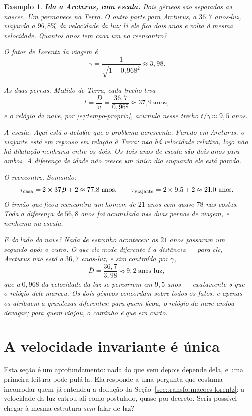\documentclass[12pt,a4paper,oneside]{book}
\theoremstyle{rgplain}
\newtheorem{example}{Exemplo}[chapter]
\theoremstyle{rgremark}
\begin{document}
\begin{example}
\textbf{Ida a Arcturus, com escala.} Dois gêmeos são separados ao nascer. Um
permanece na Terra. O outro parte para Arcturus, a $36{,}7$ anos-luz, viajando a
$96{,}8\%$ da velocidade da luz; lá ele fica \emph{dois anos} e volta à mesma
velocidade. Quantos anos tem cada um no reencontro?

O fator de Lorentz da viagem é
\[
  \gamma=\frac{1}{\sqrt{1-0{,}968^2}}\approx 3{,}98 .
\]

\emph{As duas pernas.} Medido da Terra, cada trecho leva
\[
  t=\frac{D}{v}=\frac{36{,}7}{0{,}968}\approx 37{,}9\ \text{anos},
\]
e o relógio da nave, por \eqref{eq:tempo-proprio}, acumula nesse trecho
$t/\gamma\approx 9{,}5$ anos.

\emph{A escala.} Aqui está o detalhe que o problema acrescenta. Parado em
Arcturus, o viajante está em repouso em relação à Terra: não há velocidade
relativa, logo não há dilatação nenhuma entre os dois. Os dois anos de escala
são dois anos \emph{para ambos}. A diferença de idade não cresce um único dia
enquanto ele está parado.

\emph{O reencontro.} Somando:
\[
  \tau_{\rm casa}=2\times 37{,}9+2\approx 77{,}8\ \text{anos},
  \qquad
  \tau_{\rm viajante}=2\times 9{,}5+2\approx 21{,}0\ \text{anos}.
\]
O irmão que ficou reencontra um homem de $21$ anos com quase $78$ nas costas.
Toda a diferença de $56{,}8$ anos foi acumulada nas duas pernas de viagem, e
nenhuma na escala.

\emph{E do lado da nave?} Nada de estranho aconteceu: os $21$ anos passaram um
segundo após o outro. O que ele mede diferente é a \emph{distância} --- para
ele, Arcturus não está a $36{,}7$ anos-luz, e sim contraída por $\gamma$,
\[
  \bar D=\frac{36{,}7}{3{,}98}\approx 9{,}2\ \text{anos-luz},
\]
que a $0{,}968$ da velocidade da luz se percorrem em $9{,}5$ anos --- exatamente
o que o relógio dele marcou. Os dois gêmeos concordam sobre todos os fatos, e
apenas os atribuem a grandezas diferentes: para quem ficou, o relógio da nave
andou devagar; para quem viajou, o caminho é que era curto.
\end{example}

\section{A velocidade invariante é única}
\label{sec:velocidade-invariante}

Esta seção é um aprofundamento: nada do que vem depois depende dela, e uma
primeira leitura pode pulá-la. Ela responde a uma pergunta que costuma
incomodar quem já entendeu a dedução da
Seção~\ref{sec:transformacoes-lorentz}: a velocidade da luz entrou ali como
postulado, quase por decreto. Seria possível chegar à mesma estrutura
\emph{sem} falar de luz?
\end{document}

